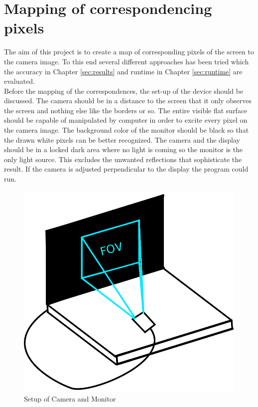 \documentclass[journal,final,a4paper,twoside]{PS}
\begin{document}
\section{Mapping of correspondencing pixels}
\label{sec:mapping}
The aim of this project is to create a map of corresponding pixels of the screen to the camera image. To this end several different approaches has been tried which the accuracy in Chapter \ref{sec:results} and runtime in Chapter \ref{sec:runtime} are evaluated. \\
Before the mapping of the correspondences, the set-up of the device should be discussed. The camera should be in a distance to the screen that it only observes the screen and nothing else like the borders or so. The entire visible flat surface should be capable of manipulated by computer in order to excite every pixel on the camera image. The background color of the monitor should be black so that the drawn white pixels can be better recognized. The camera and the display should be in a locked dark area where no light is coming so the monitor is the only light source. This excludes the unwanted reflections that sophisticate the result. If the camera is adjusted perpendicular to the display the program could run.
\begin{figure}[h]
\begin{center}
\includegraphics[scale=0.25]{./pics/setup.png}
\caption{Setup of Camera and Monitor}
\label{fig:setup}
\end{center}
\end{figure}\\
\end{document}
